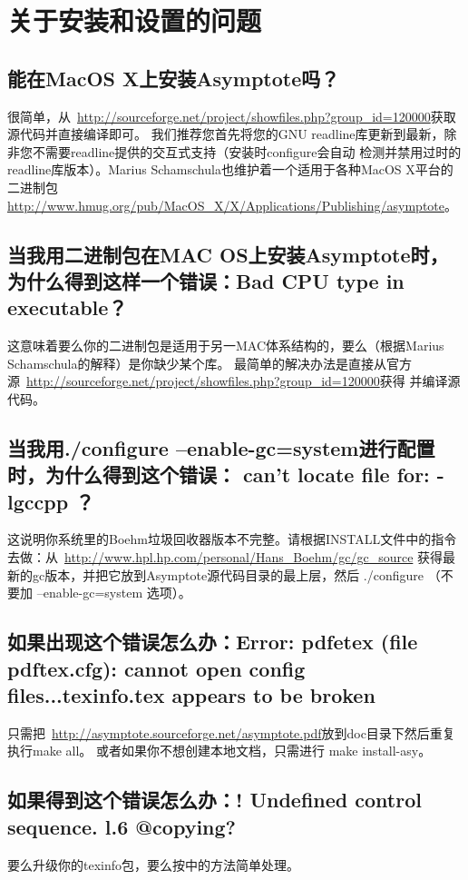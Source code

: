 \section{\label{Q2}关于安装和设置的问题}
\subsection{\label{Q2.1}能在MacOS X上安装Asymptote吗？}
很简单，从~\url{http://sourceforge.net/project/showfiles.php?group_id=120000}获取源代码并直接编译即可。
我们推荐您首先将您的GNU readline库更新到最新，除非您不需要readline提供的交互式支持（安装时configure会自动
检测并禁用过时的readline库版本）。Marius Schamschula也维护着一个适用于各种MacOS X平台的二进制包
\url{http://www.hmug.org/pub/MacOS_X/X/Applications/Publishing/asymptote}。

\subsection{\label{Q2.2}当我用二进制包在MAC OS上安装Asymptote时，为什么得到这样一个错误：Bad CPU type in executable？}
这意味着要么你的二进制包是适用于另一MAC体系结构的，要么（根据Marius Schamschula的解释）是你缺少某个库。
最简单的解决办法是直接从官方源~\url{http://sourceforge.net/project/showfiles.php?group_id=120000}获得
并编译源代码。

\subsection{\label{Q2.3}当我用./configure --enable-gc=system进行配置时，为什么得到这个错误： can't locate file for: -lgccpp ？}
这说明你系统里的Boehm垃圾回收器版本不完整。请根据INSTALL文件中的指令去做：从~\url{http://www.hpl.hp.com/personal/Hans_Boehm/gc/gc_source}
获得最新的gc版本，并把它放到Asymptote源代码目录的最上层，然后 ./configure （不要加 --enable-gc=system 选项）。

\subsection{\label{Q2.4}如果出现这个错误怎么办：Error: pdfetex (file pdftex.cfg): 
cannot open config files...texinfo.tex appears to be broken}
只需把~\url{http://asymptote.sourceforge.net/asymptote.pdf}放到doc目录下然后重复执行make all。
或者如果你不想创建本地文档，只需进行 make install-asy。

\subsection{\label{Q2.5}如果得到这个错误怎么办：! Undefined control sequence. l.6 @copying?}
要么升级你的texinfo包，要么按中的方法简单处理。

